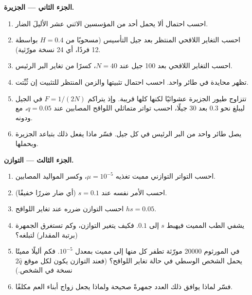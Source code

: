 \begin{problem}
\medskip
\noindent\textbf{الجزء الثاني --- الجزيرة.}
\begin{enumerate}[resume]
  \item احسب احتمال ألا يحمل أحد من المؤسسين الاثني عشر
        الأليلَ الضار.
  \item احسب التغاير اللاقحي المنتظر بعد جيل
        التأسيس (مسحوبًا من $H = 0.4$ بواسطة 12 فردًا، أي 24
        نسخة مورّثية).
  \item احسب التغاير اللاقحي بعد 100 جيل عند $N =
        40$، كسرًا من تغاير البر الرئيس.
  \item تظهر  محايدة في طائر واحد. احسب
        احتمال تثبيتها والزمن المنتظر للتثبيت إن
        ثُبِّتت.
  \item تتزاوج طيور الجزيرة عشوائيًا لكنها كلها قريبة. وإذ
        يتراكم $F = 1/(2N)$ في الجيل ليبلغ نحو $0.3$ بعد
        30 جيلًا، احسب تواتر متماثلي اللواقح المصابين
         عند $q = 0.05$، مع  ودونه.
  \item يصل طائر واحد من البر الرئيس في كل جيل. فسّر ماذا
        يفعل ذلك بتباعد الجزيرة وبحملها.
\end{enumerate}

\medskip
\noindent\textbf{الجزء الثالث --- التوازن.}
\begin{enumerate}[resume]
  \item احسب التواتر التوازني  مميت تغذيه
        $\mu = 10^{-5}$، وكسر المواليد المصابين.
  \item احسب الأمر نفسه عند $s = 0.1$ (أي  ضار
        ضررًا خفيفًا).
  \item احسب التوازن   ضرره عند
        تغاير اللواقح $hs = 0.05$.
  \item يشفي الطب المميت فيهبط $s$ إلى $0.1$. فكيف
        يتغير التوازن، وكم تستغرق الجمهرة (برتبة
        المقدار) لتبلغه؟
  \item في المورثوم \num{20000} مورّثة تطفر كل منها إلى
         مميت بمعدل $10^{-5}$. فكم أليلًا مميتًا يحمل
        الشخص الوسطي في حالة تغاير اللواقح؟ (فعند
        التوازن يكون لكل موقع $2\hat q$ نسخة في الشخص.)
  \item فسّر لماذا يوافق ذلك العدد جمهرةً صحيحة ولماذا
        يجعل زواج أبناء العم مكلفًا.
\end{enumerate}


\end{problem}
